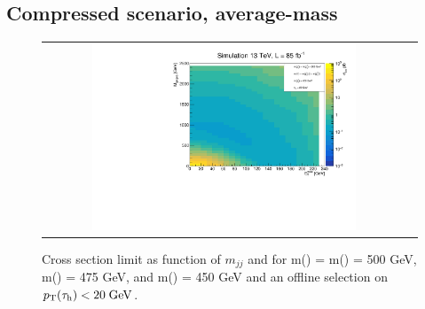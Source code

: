 \FloatBarrier

\subsection*{Compressed scenario, average-\stau mass}


\begin{figure}[tbh!]
	\centering
	\begin{tabular}{cc}
		\includegraphics[width=0.75\textwidth]{analysis/pics/JetInvMass_vs_MET_xseclim_Chargino500_Stau475_LSP450_taupt20.pdf}
	\end{tabular}
	\caption{Cross section limit as function of $m_{jj}$ and \met for m(\charginopm) = m(\neutralinotwo) = 500 GeV,  m(\stau) = 475 GeV, and m(\neutralinoone) = 450 GeV and an offline selection on $p_{\text{T}}(\tau_{\text{h}}) <  20\;\text{Ge}\kern-0.06667em\text{V}$.}
	\label{fig::JetInvMass_vs_MET_xseclim_Chargino500_Stau475_LSP450_taupt20}
\end{figure}

